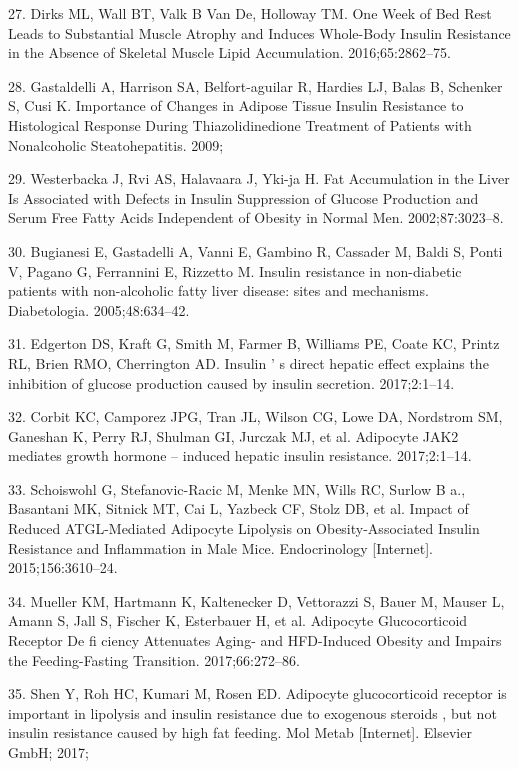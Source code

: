 \documentclass[11pt]{article} %
\begin{document}
27. Dirks ML, Wall BT, Valk B Van De, Holloway TM. One Week of Bed Rest
Leads to Substantial Muscle Atrophy and Induces Whole-Body Insulin
Resistance in the Absence of Skeletal Muscle Lipid Accumulation.
2016;65:2862--75.

28. Gastaldelli A, Harrison SA, Belfort-aguilar R, Hardies LJ, Balas B,
Schenker S, Cusi K. Importance of Changes in Adipose Tissue Insulin
Resistance to Histological Response During Thiazolidinedione Treatment
of Patients with Nonalcoholic Steatohepatitis. 2009;

29. Westerbacka J, Rvi AS, Halavaara J, Yki-ja H. Fat Accumulation in
the Liver Is Associated with Defects in Insulin Suppression of Glucose
Production and Serum Free Fatty Acids Independent of Obesity in Normal
Men. 2002;87:3023--8.

30. Bugianesi E, Gastadelli A, Vanni E, Gambino R, Cassader M, Baldi S,
Ponti V, Pagano G, Ferrannini E, Rizzetto M. Insulin resistance in
non-diabetic patients with non-alcoholic fatty liver disease: sites and
mechanisms. Diabetologia. 2005;48:634--42.

31. Edgerton DS, Kraft G, Smith M, Farmer B, Williams PE, Coate KC,
Printz RL, Brien RMO, Cherrington AD. Insulin ' s direct hepatic effect
explains the inhibition of glucose production caused by insulin
secretion. 2017;2:1--14.

32. Corbit KC, Camporez JPG, Tran JL, Wilson CG, Lowe DA, Nordstrom SM,
Ganeshan K, Perry RJ, Shulman GI, Jurczak MJ, et al. Adipocyte JAK2
mediates growth hormone -- induced hepatic insulin resistance.
2017;2:1--14.

33. Schoiswohl G, Stefanovic-Racic M, Menke MN, Wills RC, Surlow B a.,
Basantani MK, Sitnick MT, Cai L, Yazbeck CF, Stolz DB, et al. Impact of
Reduced ATGL-Mediated Adipocyte Lipolysis on Obesity-Associated Insulin
Resistance and Inflammation in Male Mice. Endocrinology {[}Internet{]}.
2015;156:3610--24. 

34. Mueller KM, Hartmann K, Kaltenecker D, Vettorazzi S, Bauer M, Mauser
L, Amann S, Jall S, Fischer K, Esterbauer H, et al. Adipocyte
Glucocorticoid Receptor De fi ciency Attenuates Aging- and HFD-Induced
Obesity and Impairs the Feeding-Fasting Transition. 2017;66:272--86.

35. Shen Y, Roh HC, Kumari M, Rosen ED. Adipocyte glucocorticoid
receptor is important in lipolysis and insulin resistance due to
exogenous steroids , but not insulin resistance caused by high fat
feeding. Mol Metab {[}Internet{]}. Elsevier GmbH; 2017; 
\end{document}
